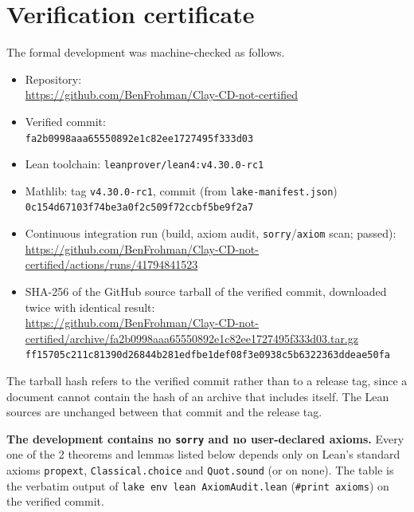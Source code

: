 \documentclass[11pt]{amsart}
\theoremstyle{definition}
\theoremstyle{remark}
\begin{document}
\section{Verification certificate}\label{app:verification-certificate}

The formal development was machine-checked as follows.

{\raggedright
\begin{itemize}
\item Repository:\\ {\footnotesize\url{https://github.com/BenFrohman/Clay-CD-not-certified}}
\item Verified commit:\\ {\footnotesize\texttt{fa2b0998aaa65550892e1c82ee1727495f333d03}}
\item Lean toolchain: \texttt{leanprover/lean4:v4.30.0-rc1}
\item Mathlib: tag \texttt{v4.30.0-rc1}, commit (from \texttt{lake-manifest.json})\\ {\footnotesize\texttt{0c154d67103f74be3a0f2c509f72ccbf5be9f2a7}}
\item Continuous integration run (build, axiom audit, \texttt{sorry}/\texttt{axiom} scan; passed):\\ {\footnotesize\url{https://github.com/BenFrohman/Clay-CD-not-certified/actions/runs/41794841523}}
\item SHA-256 of the GitHub source tarball of the verified commit, downloaded twice with identical result:\\ {\footnotesize\url{https://github.com/BenFrohman/Clay-CD-not-certified/archive/fa2b0998aaa65550892e1c82ee1727495f333d03.tar.gz}}\\
{\footnotesize\texttt{ff15705c211c81390d26844b281edfbe1def08f3e0938c5b6322363ddeae50fa}}
\end{itemize}\par}

The tarball hash refers to the verified commit rather than to a release tag, since a document cannot contain the hash of an archive that includes itself. The Lean sources are unchanged between that commit and the release tag.

\textbf{The development contains no \texttt{sorry} and no user-declared axioms.} Every one of the 2 theorems and lemmas listed below depends only on Lean's standard axioms \texttt{propext}, \texttt{Classical.choice} and \texttt{Quot.sound} (or on none). The table is the verbatim output of \texttt{lake env lean AxiomAudit.lean} (\texttt{\#print axioms}) on the verified commit.
\end{document}
